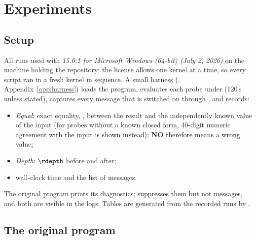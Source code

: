 \section{Experiments}
\label{sec:experiments}

\subsection{Setup}
\label{sec:setup}
All runs used  with \emph{15.0.1 for Microsoft Windows
(64-bit) (July 2, 2026)} on the machine holding the repository; the license
allows one kernel at a time, so every script ran in a fresh kernel in
sequence. A small harness (, Appendix~\ref{app:harness}) loads
the program, evaluates each probe under  (120\,s unless
stated), captures every message that is switched on through
, and records:
\begin{itemize}
\item \emph{Equal}: exact equality, ,
      between the result and the independently known value of the input (for
      probes without a known closed form, 40-digit numeric agreement with the
      input is shown instead); \textbf{NO} therefore means a wrong value;
\item \emph{Depth}: $\rdepth$ before and after;
\item wall-clock time and the list of messages.
\end{itemize}
The original program prints its diagnostics;  suppresses them but
not messages, and both are visible in the logs. Tables are generated from the
recorded runs by .

\subsection{The original program}
\label{sec:exporig}

